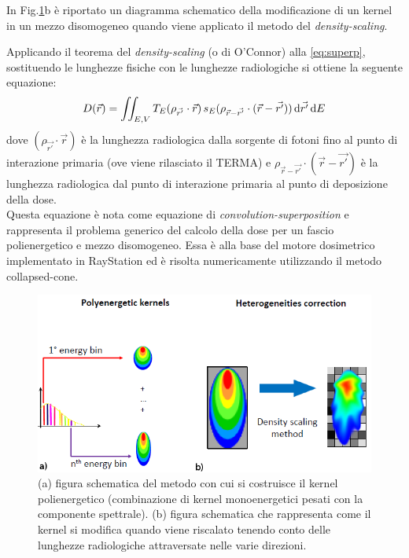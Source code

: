 {%

In Fig.\ref{fig:kern_trans}b è riportato un diagramma schematico della modificazione di un kernel in un mezzo disomogeneo quando viene applicato il metodo del \textit{density-scaling}.

Applicando il teorema del \textit{density-scaling} (o di O'Connor) alla \eqref{eq:superp}, sostituendo le lunghezze fisiche con le lunghezze radiologiche \cite{Khan2010} si ottiene la seguente equazione:
\begin{equation}
D(\vec{r}) = \iint_{E,V} T_E(\rho_{\vec{r'}} \cdot \vec{r})\, s_E(\rho_{\vec{r}-\vec{r'}}\cdot (\vec{r}-\vec{r'}))\,\text{d}\vec{r'} \,\text{d} E
\label{eq:superp_disom}
\end{equation}
dove $(\rho_{\vec{r'}} \cdot \vec{r})$ è la lunghezza radiologica dalla sorgente di fotoni fino al punto di interazione primaria (ove viene rilasciato il TERMA) e $\rho_{\vec{r}-\vec{r'}}\cdot (\vec{r}-\vec{r'})$ è la lunghezza radiologica dal punto di interazione primaria al punto di deposizione della dose.\\
Questa equazione è nota come equazione di \textit{convolution-superposition} e rappresenta il problema generico del calcolo della dose per un fascio polienergetico e mezzo disomogeneo. Essa è alla base del motore dosimetrico implementato in RayStation ed è risolta numericamente utilizzando il metodo collapsed-cone.

\begin{figure}
\centering
\includegraphics[width=\textwidth]{./cap1/kern_trans.png}
\caption{(a) figura schematica del metodo con cui si costruisce il kernel polienergetico (combinazione di kernel monoenergetici pesati con la componente spettrale). (b) figura schematica che rappresenta come il kernel si modifica quando viene riscalato tenendo conto delle lunghezze radiologiche attraversate nelle varie direzioni.}
\label{fig:kern_trans}
\end{figure}




}
